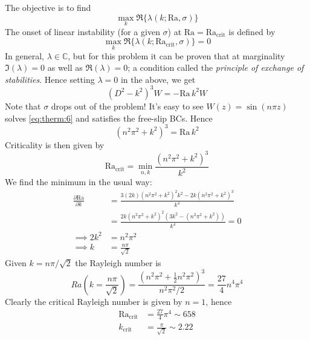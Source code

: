 \documentclass{jknotes}
\newcommand{\Ra}{\text{Ra}}
\begin{document}
The objective is to find 
\begin{equation}
	\max_k \Re\{ \lambda(k;\Ra,\sigma)\}
\end{equation}
The onset of linear instability (for a given $\sigma$) at $\Ra =
\Ra_{\text{crit}}$ is defined by
\begin{equation}
	\max_k \Re\{\lambda(k; \Ra_{\text{crit}},\sigma)\} = 0
\end{equation}
In general, $\lambda \in \mathbb{C}$, but for this problem it can be proven
that at marginality $\Im(\lambda) = 0$ as well as $\Re(\lambda) = 0$; a
condition called the \emph{principle of exchange of stabilities}. Hence
setting $\lambda = 0$ in the above, we get
\begin{equation}
	(D^2 - k^2)^3 W = - \Ra \,k^2 W
	\label{eq:therm:6}
\end{equation}
Note that $\sigma$ drops out of the problem! It's easy to see $W(z) = \sin
(n\pi z)$ solves \eqref{eq:therm:6} and satisfies the free-slip BCs. Hence
\begin{equation}
	(n^2 \pi^2 + k^2)^3 = \Ra \,k^2
\end{equation}
Criticality is then given by
\begin{equation}
	\Ra_{\text{crit}} = \min_{n,k} \frac{(n^2 \pi^2 + k^2)^3}{k^2}
\end{equation}
We find the minimum in the usual way:
\begin{align}
	\frac{\partial \Ra}{\partial k} &= \frac{3(2k)(n^2\pi^2 + k^2)^2 k^2 -
	2k(n^2\pi^2 + k^2)^3}{k^4} \\
									&= \frac{2k(n^2\pi^2
									+k^2)^2(3k^2-(n^2\pi^2+k^2))}{k^4} = 0\\
		\implies 2k^2 &= n^2 \pi^2 \\
		\implies k &= \frac{n\pi}{\sqrt{2}}
\end{align}
Given $k = n\pi/\sqrt{2}$ the Rayleigh number is
\begin{equation}
	Ra(k = \frac{n\pi}{\sqrt{2}}) = \frac{(n^2\pi^2 +
	\frac{1}{2}n^2\pi^2)^3}{n^2 \pi^2/2} = \frac{27}{4}n^4 \pi^4
\end{equation}
Clearly the critical Rayleigh number is given by $n=1$, hence
\begin{align}
	\Ra_{\text{crit}} &= \frac{27}{4}\pi^4 \sim 658 \\
	k_{\text{crit}} &= \frac{\pi}{\sqrt{2}} \sim 2.22
\end{align}
\end{document}
